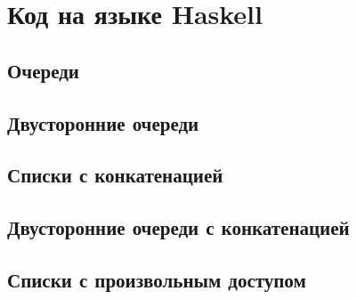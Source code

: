 \appendix
\chapter{Код на языке Haskell}
\label{app:A}
\lstset{language=Haskell}
\section{Очереди}

\codesep

\codesep

\codesep

\codesep

\codesep

\codesep


\section{Двусторонние очереди}

\codesep


\section{Списки с конкатенацией}

\codesep


\section{Двусторонние очереди с конкатенацией}

\codesep

\codesep


\section{Списки с произвольным доступом}

\codesep

\codesep


